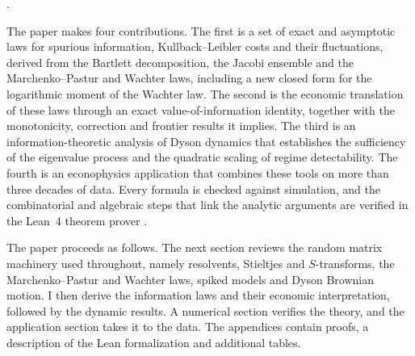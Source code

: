 \citep{fama1970efficient,kyle1985continuous}.

The paper makes four contributions. The first is a set of exact and asymptotic laws for spurious information, Kullback--Leibler costs and their fluctuations, derived from the Bartlett decomposition, the Jacobi ensemble and the Marchenko--Pastur and Wachter laws, including a new closed form for the logarithmic moment of the Wachter law. The second is the economic translation of these laws through an exact value-of-information identity, together with the monotonicity, correction and frontier results it implies. The third is an information-theoretic analysis of Dyson dynamics that establishes the sufficiency of the eigenvalue process and the quadratic scaling of regime detectability. The fourth is an econophysics application that combines these tools on more than three decades of data. Every formula is checked against simulation, and the combinatorial and algebraic steps that link the analytic arguments are verified in the Lean~4 theorem prover \citep{demoura2021lean}.

The paper proceeds as follows. The next section reviews the random matrix machinery used throughout, namely resolvents, Stieltjes and $S$-transforms, the Marchenko--Pastur and Wachter laws, spiked models and Dyson Brownian motion. I then derive the information laws and their economic interpretation, followed by the dynamic results. A numerical section verifies the theory, and the application section takes it to the data. The appendices contain proofs, a description of the Lean formalization and additional tables.
